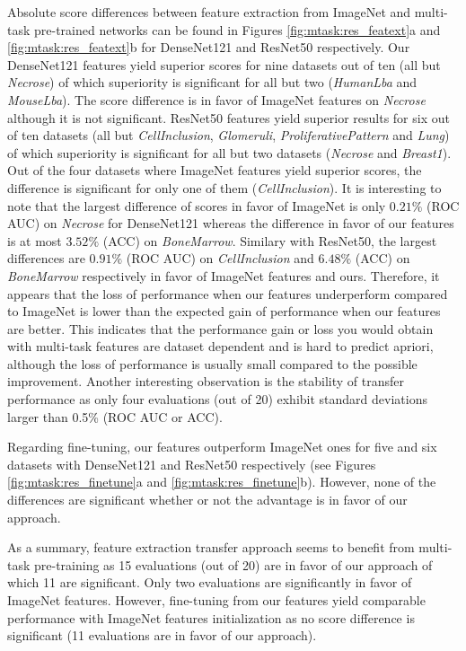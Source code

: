Absolute score differences between feature extraction from ImageNet and multi-task pre-trained networks can be found in Figures \ref{fig:mtask:res_featext}a and \ref{fig:mtask:res_featext}b for DenseNet121 and ResNet50 respectively. Our DenseNet121 features yield superior scores for nine datasets out of ten (all but \textit{Necrose}) of which superiority is significant for all but two (\textit{HumanLba} and \textit{MouseLba}). The score difference is in favor of ImageNet features on \textit{Necrose} although it is not significant. ResNet50 features yield superior results for six out of ten datasets (all but \textit{CellInclusion}, \textit{Glomeruli}, \textit{ProliferativePattern} and \textit{Lung}) of which superiority is significant for all but two datasets (\textit{Necrose} and \textit{Breast1}). Out of the four datasets where ImageNet features yield superior scores, the difference is significant for only one of them (\textit{CellInclusion}). It is interesting to note that the largest difference of scores in favor of ImageNet is only $0.21\%$ (ROC AUC) on \textit{Necrose} for DenseNet121 whereas the difference in favor of our features is at most $3.52\%$ (ACC) on \textit{BoneMarrow}. Similary with ResNet50, the largest differences are $0.91\%$ (ROC AUC) on \textit{CellInclusion} and $6.48\%$ (ACC) on \textit{BoneMarrow} respectively in favor of ImageNet features and ours. Therefore, it appears that the loss of performance when our features underperform compared to ImageNet is lower than the expected gain of performance when our features are better. This indicates that the performance gain or loss you would obtain with multi-task features are dataset dependent and is hard to predict apriori, although the loss of performance is usually small compared to the possible improvement. Another interesting observation is the stability of transfer performance as only four evaluations (out of 20) exhibit standard deviations larger than 0.5\% (ROC AUC or ACC). 

Regarding fine-tuning, our features outperform ImageNet ones for five and six datasets with DenseNet121 and ResNet50 respectively (see Figures \ref{fig:mtask:res_finetune}a and \ref{fig:mtask:res_finetune}b). However, none of the differences are significant whether or not the advantage is in favor of our approach.

As a summary, feature extraction transfer approach seems to benefit from multi-task pre-training as 15 evaluations (out of 20) are in favor of our approach of which 11 are significant. Only two evaluations are significantly in favor of ImageNet features.  However, fine-tuning from our features yield comparable performance with ImageNet features initialization as no score difference is significant (11 evaluations are in favor of our approach).

